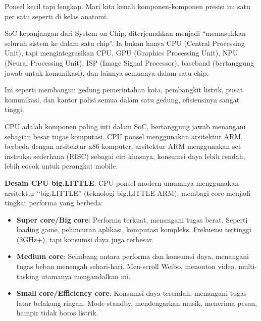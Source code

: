 


Ponsel kecil tapi lengkap. Mari kita kenali komponen-komponen presisi ini satu per satu seperti di kelas anatomi.


SoC kepanjangan dari System on Chip, diterjemahkan menjadi “memasukkan seluruh sistem ke dalam satu chip”. Ia bukan hanya CPU (Central Processing Unit), tapi mengintegrasikan CPU, GPU (Graphics Processing Unit), NPU (Neural Processing Unit), ISP (Image Signal Processor), baseband (bertanggung jawab untuk komunikasi), dan lainnya semuanya dalam satu chip.

Ini seperti membangun gedung pemerintahan kota, pembangkit listrik, pusat komunikasi, dan kantor polisi semua dalam satu gedung, efisiensinya sangat tinggi.


CPU adalah komponen paling inti dalam SoC, bertanggung jawab menangani sebagian besar tugas komputasi. CPU ponsel menggunakan arsitektur ARM, berbeda dengan arsitektur x86 komputer, arsitektur ARM menggunakan set instruksi sederhana (RISC) sebagai ciri khasnya, konsumsi daya lebih rendah, lebih cocok untuk perangkat mobile.

\textbf{Desain CPU big.LITTLE}: CPU ponsel modern umumnya menggunakan arsitektur “big.LITTLE” (teknologi big.LITTLE ARM), membagi core menjadi tingkat performa yang berbeda:

\begin{itemize}
  \item \textbf{Super core/Big core}: Performa terkuat, menangani tugas berat. Seperti loading game, peluncuran aplikasi, komputasi kompleks. Frekuensi tertinggi (3GHz+), tapi konsumsi daya juga terbesar.
  \item \textbf{Medium core}: Seimbang antara performa dan konsumsi daya, menangani tugas beban menengah sehari-hari. Men-scroll Weibo, menonton video, multi-tasking utamanya mengandalkan ini.
  \item \textbf{Small core/Efficiency core}: Konsumsi daya terendah, menangani tugas latar belakang ringan. Mode standby, mendengarkan musik, menerima pesan, hampir tidak boros listrik.
\end{itemize}

